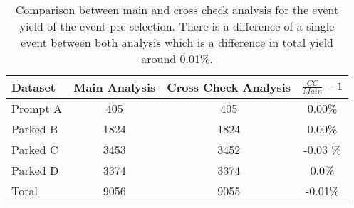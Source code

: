 \begin{table}[!htp]
\centering

\begin{tabular}{|l|c|c|c|}
\hline
Dataset & Main Analysis & Cross Check Analysis & $\frac{CC}{Main}-1$ \\ 
\hline \hline
Prompt A &  405 &  405 & 0.00\% \\
Parked B & 1824 & 1824 & 0.00\% \\
Parked C & 3453 & 3452 & -0.03 \% \\
Parked D & 3374 & 3374 & 0.0\% \\
\hline \hline
Total & 9056 & 9055 & -0.01\% \\
\hline
\end{tabular}

\caption{Comparison between main and cross check analysis for the event yield of the event pre-selection. There is a difference of a single event between both analysis which is a difference in total yield around 0.01\%.}
\end{table}
